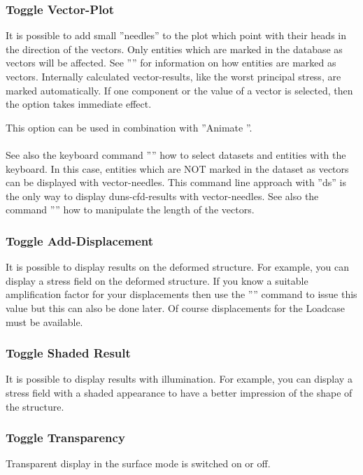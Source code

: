 \documentclass{article}
\begin{document}
\subsubsection{\label{Toggle Vector-Plot}Toggle Vector-Plot}
It is possible to add small ''needles'' to the plot which point with their heads in the direction of the vectors. Only entities which are marked in the database as vectors will be affected. See '''' for information on how entities are marked as vectors. Internally calculated vector-results, like the worst principal stress, are marked automatically. If one component or the value of a vector is selected, then the option takes immediate effect.

This option can be used in combination with ''Animate ''.\\\\See also the keyboard command '''' how to select datasets and entities with the keyboard. In this case, entities which are NOT marked in the dataset as vectors can be displayed with vector-needles. This command line approach with ''ds'' is the only way to display duns-cfd-results with vector-needles. See also the command '''' how to manipulate the length of the vectors.  

\subsubsection{\label{Toggle Add-Displacement}Toggle Add-Displacement}
It is possible to display results on the deformed structure. For example, you can display a stress field on the deformed structure. If you know a suitable amplification factor for your displacements then use the '''' command to issue this value but this can also be done later. Of course displacements for the Loadcase must be available.

\subsubsection{\label{Toggle Shaded Result}Toggle Shaded Result}
It is possible to display results with illumination. For example, you can display a stress field with a shaded appearance to have a better impression of the shape of the structure.

\subsubsection{\label{Toggle Transparency}Toggle Transparency}
Transparent display in the surface mode is switched on or off.
\end{document}
